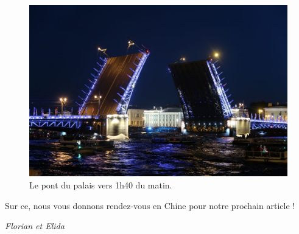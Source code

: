 \begin{figure}
\centering
\includegraphics{images/20180606_pontpalais.JPG}
\caption{Le pont du palais vers 1h40 du matin.}
\end{figure}

Sur ce, nous vous donnons rendez-vous en Chine pour notre prochain
article !

\emph{Florian et Elida}
